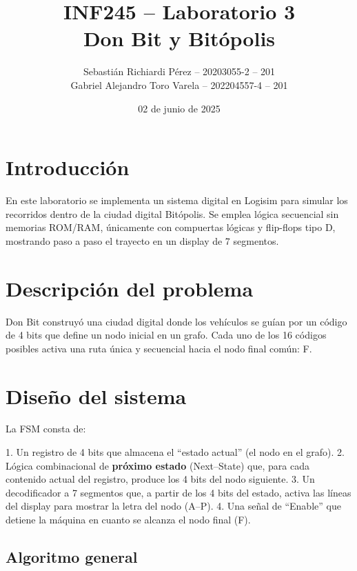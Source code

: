 \documentclass[12pt]{article}
\title{\textbf{INF245 – Laboratorio 3} \\ Don Bit y Bitópolis}
\author{
    Sebastián Richiardi Pérez – 20203055-2 – 201\\
    Gabriel Alejandro Toro Varela – 202204557-4 – 201
}
\date{02 de junio de 2025}
\begin{document}
\maketitle

\section{Introducción}
En este laboratorio se implementa un sistema digital en Logisim para simular los recorridos dentro de la ciudad digital Bitópolis. Se emplea lógica secuencial sin memorias ROM/RAM, únicamente con compuertas lógicas y flip-flops tipo D, mostrando paso a paso el trayecto en un display de 7 segmentos.

\section{Descripción del problema}
Don Bit construyó una ciudad digital donde los vehículos se guían por un código de 4 bits que define un nodo inicial en un grafo. Cada uno de los 16 códigos posibles activa una ruta única y secuencial hacia el nodo final común: F.

\section{Diseño del sistema}

La FSM consta de:

1. Un registro de 4 bits que almacena el “estado actual” (el nodo en el grafo).  
2. Lógica combinacional de \textbf{próximo estado} (Next–State) que, para cada contenido actual del registro, produce los 4 bits del nodo siguiente.  
3. Un decodificador a 7 segmentos que, a partir de los 4 bits del estado, activa las líneas del display para mostrar la letra del nodo (A–P).  
4. Una señal de “Enable” que detiene la máquina en cuanto se alcanza el nodo final (F).

\subsection{Algoritmo general}
\end{document}

